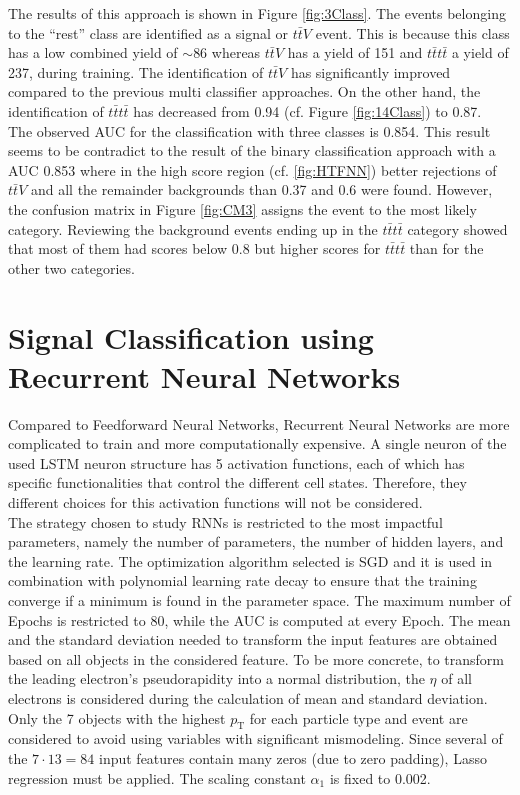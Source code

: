 The results of this approach is shown in Figure \ref{fig:3Class}. The events belonging to the ``rest'' class are identified as a signal or $t\bar{t}V$ event. This is because this class has a low combined yield of $\sim 86$ whereas $t\bar{t}V$ has a yield of 151 and $t\bar{t}t\bar{t}$ a yield of 237, during training. The identification of $t\bar{t}V$ has significantly improved compared to the previous multi classifier approaches. On the other hand, the identification of $t\bar{t}t\bar{t}$ has decreased from 0.94 (cf. Figure \ref{fig:14Class}) to 0.87. \\
The observed AUC for the classification with three classes is 0.854. This result seems to be contradict to the result of the binary classification approach with a AUC 0.853 where in the high score region (cf. \ref{fig:HTFNN}) better rejections of $t\bar{t}V$ and all the remainder backgrounds than 0.37 and 0.6 were found. However, the confusion matrix in Figure \ref{fig:CM3} assigns the event to the most likely category. Reviewing the background events ending up in the $t\bar{t}t\bar{t}$ category showed that most of them had scores below 0.8 but higher scores for $t\bar{t}t\bar{t}$ than for the other two categories.

\newpage


\section{Signal Classification using Recurrent Neural Networks}
\label{sec:RNN_results}

Compared to Feedforward Neural Networks, Recurrent Neural Networks are more complicated to train and more computationally expensive. A single neuron of the used LSTM neuron structure has 5 activation functions, each of which has specific functionalities that control the different cell states. Therefore, they different choices for this activation functions will not be considered. \\
The strategy chosen to study RNNs is restricted to the most impactful parameters, namely the number of parameters, the number of hidden layers, and the learning rate. The optimization algorithm selected is SGD and it is used in combination with polynomial learning rate decay to ensure that the training converge if a minimum is found in the parameter space. The maximum number of Epochs is restricted to 80, while the AUC is computed at every Epoch. The mean and the standard deviation needed to transform the input features are obtained based on all objects in the considered feature. To be more concrete, to transform the leading electron's pseudorapidity into a normal distribution, the $\eta$ of all electrons is considered during the calculation of mean and standard deviation. Only the 7 objects with the highest $p_{\text{T}}$ for each particle type and event are considered to avoid using variables with significant mismodeling. Since several of the $ 7 \cdot 13 = 84$ input features contain many zeros (due to zero padding), Lasso regression must be applied. The scaling constant $\alpha_1$ is fixed to 0.002.


